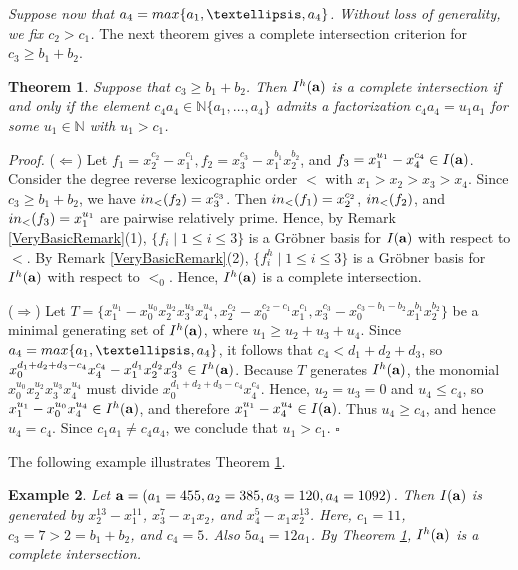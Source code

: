 \documentclass[10pt,a4paper]{amsart}
\newtheorem{thm1}{Theorem}[section]
\newtheorem{ex1}[thm1]{Example}
\begin{document}
{\em Suppose now that $a_{4}={\rm max}\{a_1,\ldots,a_4\}$. Without loss of generality, we fix $c_{2}>c_{1}$.} The next theorem gives a complete intersection criterion for $c_{3} \geq b_1+b_2$.

\begin{thm1} \label{Basic25} Suppose that $c_{3} \geq b_1+b_2$. Then $I^{h}({\bf a})$ is a complete intersection if and only if the element $c_{4}a_4 \in \mathbb{N}\{a_1,\ldots,a_4\}$ admits a factorization $c_{4}a_4=u_1a_{1}$ for some $u_1 \in \mathbb{N}$ with $u_{1}>c_1$.
\end{thm1}

{\em \noindent Proof.} ($\Leftarrow$) Let $f_{1}=x_{2}^{c_2}-x_{1}^{c_1}, f_{2}=x_{3}^{c_3}-x_{1}^{b_1}x_2^{b_2}$, and $f_{3}=x_{1}^{u_1}-x_{4}^{c_4} \in I({\bf a})$. Consider the degree reverse lexicographic order $<$ with $x_1>x_2>x_3>x_4$. Since $c_3 \geq b_1+b_2$, we have ${\rm in}_{<}(f_2)=x_{3}^{c_3}$. Then ${\rm in}_{<}(f_{1})=x_{2}^{c_2}$, ${\rm in}_{<}(f_{2})$, and ${\rm in}_{<}(f_{3})=x_{1}^{u_1}$ are pairwise relatively prime. Hence, by Remark \ref{VeryBasicRemark}(1), $\{f_{i} \mid 1 \leq i \leq 3\}$ is a Gr\"obner basis for $I({\bf a})$ with respect to $<$. By Remark \ref{VeryBasicRemark}(2), $\{f_{i}^h \mid 1 \leq i \leq 3\}$ is a Gr\"obner basis for $I^{h}({\bf a})$ with respect to $<_{0}$. Hence, $I^{h}({\bf a})$ is a complete intersection.

($\Rightarrow$) Let $T=\{x_{1}^{u_1}-x_{0}^{u_0}x_{2}^{u_2}x_{3}^{u_3}x_{4}^{u_4}, x_{2}^{c_2}-x_{0}^{c_2-c_1}x_{1}^{c_1}, x_{3}^{c_3}-x_{0}^{c_3-b_1-b_2}x_{1}^{b_1}x_{2}^{b_2}\}$ be a minimal generating set of $I^{h}({\bf a})$, where $u_{1} \geq u_2+u_3+u_4$. Since $a_{4}={\rm max}\{a_1,\ldots,a_4\}$, it follows that $c_{4}<d_{1}+d_{2}+d_3$, so $x_{0}^{d_{1}+d_{2}+d_3-c_{4}}x_{4}^{c_4}-x_{1}^{d_1}x_{2}^{d_2}x_{3}^{d_3} \in I^{h}({\bf a})$. Because $T$ generates $I^{h}({\bf a})$, the monomial $x_{0}^{u_0}x_{2}^{u_2}x_{3}^{u_3}x_{4}^{u_4}$ must divide $x_{0}^{d_{1}+d_{2}+d_3-c_{4}}x_{4}^{c_4}$. Hence, $u_{2}=u_{3}=0$ and $u_{4} \leq c_4$, so $x_{1}^{u_1}-x_{0}^{u_0}x_{4}^{u_4} \in I^{h}({\bf a})$, and therefore $x_{1}^{u_1}-x_{4}^{u_4} \in I({\bf a})$. Thus $u_{4} \geq c_{4}$, and hence $u_{4}=c_{4}$. Since $c_{1}a_1 \neq c_{4}a_4$, we conclude that $u_1>c_1$. \hfill $\square$ \par\vspace{0.5\baselineskip}

The following example illustrates Theorem \ref{Basic25}.

\begin{ex1} {\rm Let ${\bf a}=(a_{1}=455,a_2=385,a_3=120,a_{4}=1092)$. Then $I({\bf a})$ is generated by $x_{2}^{13}-x_{1}^{11}$, $x_{3}^{7}-x_{1}x_{2}$, and $x_{4}^{5}-x_{1}x_2^{13}$. Here, $c_1=11$, $c_{3}=7> 2=b_1+b_2$, and $c_{4}=5$. Also $5a_4=12a_1$. By Theorem \ref{Basic25}, $I^{h}({\bf a})$ is a complete intersection.}
\end{ex1}
\end{document}
